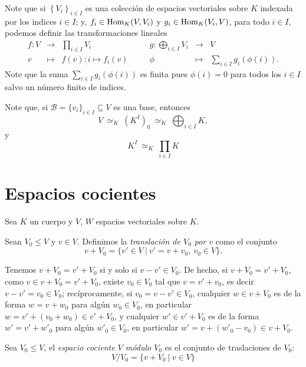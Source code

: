 \begin{obs}
Note que si $\left\{V_i\right\}_{i\in I}$ es una colecci\'on de espacios vectoriales sobre $K$ indexada por los indices $i\in I$; y, $f_i\in\operatorname{Hom}_K(V,V_i)$ y $g_i\in\operatorname{Hom}_K(V_i,V)$, para todo $i\in I$, podemos definir las transformaciones lineales
\[
\begin{array}{rclcrcl}
f:V& \longrightarrow & \prod_{i\in I} V_i &\quad& g: \bigoplus_{i\in I} V_i & \longrightarrow & V \\
  v & \longmapsto & f(v):i\mapsto f_i(v) &\quad& \phi & \longmapsto & \sum_{i\in I} g_i\left(\phi(i)\right). 
\end{array}
\]
Note que la suma $\sum_{i\in I} g_i\left(\phi(i)\right)$ es finita pues $\phi(i)=0$ para todos los $i\in I$ salvo un n\'umero finito de indices.
\end{obs}

\begin{obs}
Note que, si $\mathcal{B}=\{v_i\}_{i\in I}\subseteq V$ es una base, entonces
\[
V\ \simeq_K\ \left(K^I\right)_0\ \simeq_K\ \bigoplus_{i\in I}K,
\]
y
\[
K^I\ \simeq_K\ \prod_{i\in I} K
\]
\end{obs}

\section{Espacios cocientes}

Sea $K$ un cuerpo y $V$, $W$ espacios vectoriales sobre $K$.

\begin{defn}
Sean $V_0\le V$ y $v\in V$. Definimos la \emph{translaci\'on de $V_0$ por $v$} como el conjunto
\[
v+V_0=\{v'\in V\ |\ v'=v+v_0,\ v_0\in V\}.
\]
\end{defn}

\begin{obs}
Tenemos $v+V_0=v'+V_0$ si y solo si $v-v'\in V_0$. De hecho, si $v+V_0=v'+V_0$, como $v\in v+V_0=v'+V_0$, existe $v_0\in V_0$ tal que $v=v'+v_0$, es decir $v-v'=v_0\in V_0$; rec\'iprocamente, si $v_0=v-v'\in V_0$, cualquier $w\in v+V_0$ es de la forma $w=v+w_0$ para alg\'un $w_0\in V_0$, en particular $w=v'+(v_0+w_0)\in v'+V_0$, y cualquier $w'\in v'+V_0$ es de la forma $w'=v'+w'_0$ para alg\'un $w'_0\in V_0$, en particular $w'=v+(w'_0-v_0)\in v+V_0$.
\end{obs}

\begin{defn}
Sea $V_0\le V$, el \emph{espacio cociente $V$ m\'odulo $V_0$} es el conjunto de traslaciones de $V_0$:
\[
V/V_0=\{v+V_0\ |\ v\in V\}
\] 
\end{defn}

